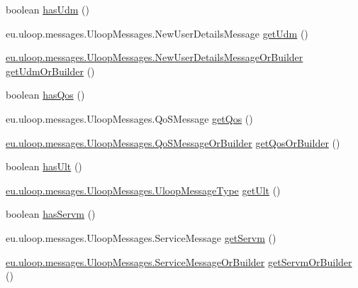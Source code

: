 \begin{DoxyCompactItemize}
\item 
boolean \hyperlink{interfaceeu_1_1uloop_1_1messages_1_1UloopMessages_1_1UloopMessageOrBuilder_a7e1dc3cd80748e1ea1fbd7c841346836}{has\+Udm} ()
\item 
eu.\+uloop.\+messages.\+Uloop\+Messages.\+New\+User\+Details\+Message \hyperlink{interfaceeu_1_1uloop_1_1messages_1_1UloopMessages_1_1UloopMessageOrBuilder_a7cfe01ecc1f958372b9424d78c56839d}{get\+Udm} ()
\item 
\hyperlink{interfaceeu_1_1uloop_1_1messages_1_1UloopMessages_1_1NewUserDetailsMessageOrBuilder}{eu.\+uloop.\+messages.\+Uloop\+Messages.\+New\+User\+Details\+Message\+Or\+Builder} \hyperlink{interfaceeu_1_1uloop_1_1messages_1_1UloopMessages_1_1UloopMessageOrBuilder_ab9ee2e91682ec0b251b2a9b39f1601a7}{get\+Udm\+Or\+Builder} ()
\item 
boolean \hyperlink{interfaceeu_1_1uloop_1_1messages_1_1UloopMessages_1_1UloopMessageOrBuilder_ac245b297ccf051ed50b3304550361b41}{has\+Qos} ()
\item 
eu.\+uloop.\+messages.\+Uloop\+Messages.\+Qo\+S\+Message \hyperlink{interfaceeu_1_1uloop_1_1messages_1_1UloopMessages_1_1UloopMessageOrBuilder_acaf90a5ad44ca054d2029990ef67c7ac}{get\+Qos} ()
\item 
\hyperlink{interfaceeu_1_1uloop_1_1messages_1_1UloopMessages_1_1QoSMessageOrBuilder}{eu.\+uloop.\+messages.\+Uloop\+Messages.\+Qo\+S\+Message\+Or\+Builder} \hyperlink{interfaceeu_1_1uloop_1_1messages_1_1UloopMessages_1_1UloopMessageOrBuilder_a7616dc3de5ac47dd894c53b41302cf50}{get\+Qos\+Or\+Builder} ()
\item 
boolean \hyperlink{interfaceeu_1_1uloop_1_1messages_1_1UloopMessages_1_1UloopMessageOrBuilder_ae218efc11084c2431c8a4c8738f27260}{has\+Ult} ()
\item 
\hyperlink{enumeu_1_1uloop_1_1messages_1_1UloopMessages_1_1UloopMessageType}{eu.\+uloop.\+messages.\+Uloop\+Messages.\+Uloop\+Message\+Type} \hyperlink{interfaceeu_1_1uloop_1_1messages_1_1UloopMessages_1_1UloopMessageOrBuilder_a89717649b52c2ce548c877996b18285d}{get\+Ult} ()
\item 
boolean \hyperlink{interfaceeu_1_1uloop_1_1messages_1_1UloopMessages_1_1UloopMessageOrBuilder_a9ee576bb30591dbca47532391205d40d}{has\+Servm} ()
\item 
eu.\+uloop.\+messages.\+Uloop\+Messages.\+Service\+Message \hyperlink{interfaceeu_1_1uloop_1_1messages_1_1UloopMessages_1_1UloopMessageOrBuilder_aa484b765e04b381b9aed5a4eee679fc8}{get\+Servm} ()
\item 
\hyperlink{interfaceeu_1_1uloop_1_1messages_1_1UloopMessages_1_1ServiceMessageOrBuilder}{eu.\+uloop.\+messages.\+Uloop\+Messages.\+Service\+Message\+Or\+Builder} \hyperlink{interfaceeu_1_1uloop_1_1messages_1_1UloopMessages_1_1UloopMessageOrBuilder_a2543acfdff88bf3c55e41a2747bf3acf}{get\+Servm\+Or\+Builder} ()

\end{DoxyCompactItemize}

